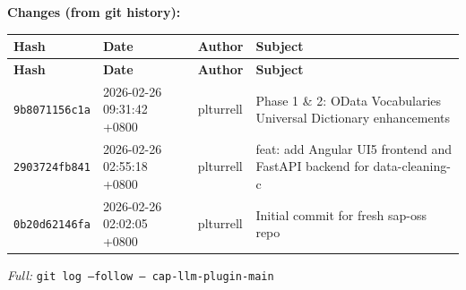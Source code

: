 \documentclass[11pt]{article}
\begin{document}
\textbf{Changes (from git history):}
\begin{longtable}{|p{2.2cm}|p{3.2cm}|l|p{6cm}|}
\hline \textbf{Hash} & \textbf{Date} & \textbf{Author} & \textbf{Subject} \\ \hline \endfirsthead
\hline \textbf{Hash} & \textbf{Date} & \textbf{Author} & \textbf{Subject} \\ \hline \endhead
\texttt{9b8071156c1a} & 2026-02-26 09:31:42 +0800 & plturrell & Phase 1 \& 2: OData Vocabularies Universal Dictionary enhancements \\
\texttt{2903724fb841} & 2026-02-26 02:55:18 +0800 & plturrell & feat: add Angular UI5 frontend and FastAPI backend for data-cleaning-c \\
\texttt{0b20d62146fa} & 2026-02-26 02:02:05 +0800 & plturrell & Initial commit for fresh sap-oss repo \\
\hline
\end{longtable}
\textit{Full:} \texttt{git log --follow -- cap-llm-plugin-main}
\end{document}
